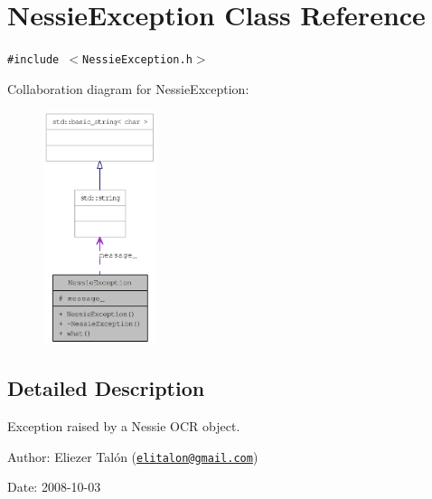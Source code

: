 \hypertarget{class_nessie_exception}{
\section{NessieException Class Reference}
\label{class_nessie_exception}
}
{\tt \#include $<$NessieException.h$>$}

Collaboration diagram for NessieException:\nopagebreak
\begin{figure}[H]
\begin{center}
\leavevmode
\includegraphics[width=94pt]{class_nessie_exception__coll__graph}
\end{center}
\end{figure}


\subsection{Detailed Description}
Exception raised by a Nessie OCR object. 

\begin{Desc}
\item[Author:]Eliezer Talón (\href{mailto:elitalon@gmail.com}{\tt elitalon@gmail.com}) \end{Desc}
\begin{Desc}
\item[Date:]2008-10-03 \end{Desc}


